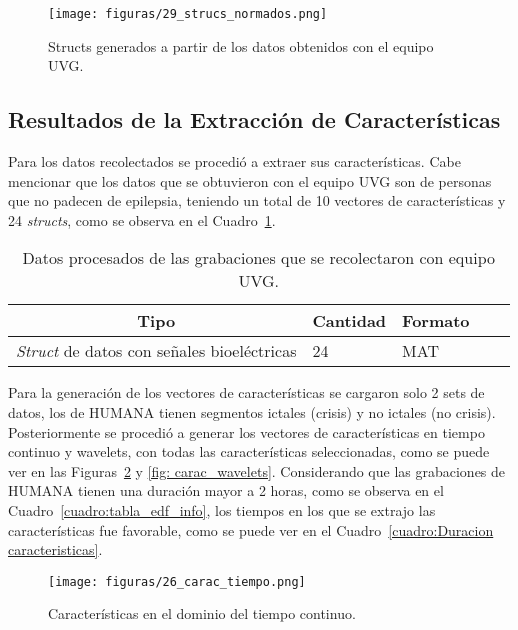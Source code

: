 \begin{figure}[t]
    \centering
    \texttt{[image: figuras/29\_strucs\_normados.png]}
    \caption{Structs generados a partir de los datos obtenidos con el equipo UVG.}
    \label{fig: Struct_normado}
\end{figure}

\subsection{Resultados de la Extracción de Características}
Para los datos recolectados se procedió a extraer sus características. Cabe mencionar que los datos que se obtuvieron con el equipo UVG son de personas que no padecen de epilepsia, teniendo un total de 10 vectores de características y 24 \textit{structs}, como se observa en el Cuadro~\ref{cuadro:tabla datos features UVG}.

\begin{table}[H]
\begin{center}
    \begin{tabular}{|l|l|l|l|l|}
    \hline
        \multicolumn{1}{|c|}{\textbf{Tipo}} & \multicolumn{1}{c|}{\textbf{Cantidad}} & \multicolumn{1}{c|}{\textbf{Formato}}\\ \hline
        \textit{Struct} de datos con señales bioeléctricas & 24  & MAT \\ \hline
    \end{tabular}
    \caption[Datos procesados en nube con equipo UVG]{Datos procesados de las grabaciones que se recolectaron con equipo UVG.} 
    \label{cuadro:tabla datos features UVG}
\end{center}
\end{table}

Para la generación de los vectores de características se cargaron solo 2 sets de datos, los de HUMANA tienen segmentos ictales (crisis) y no ictales (no crisis).
Posteriormente se procedió a generar los vectores de características en tiempo continuo y wavelets, con todas las características seleccionadas, como se puede ver en las Figuras~\ref{fig: carac_tiempo} y \ref{fig: carac_wavelets}. Considerando que las grabaciones de HUMANA tienen una duración mayor a 2 horas, como se observa en el Cuadro~\ref{cuadro:tabla_edf_info}, los tiempos en los que se extrajo las características fue favorable, como se puede ver en el Cuadro~\ref{cuadro:Duracion caracteristicas}. 

\begin{figure}[H]
    \centering
    \texttt{[image: figuras/26\_carac\_tiempo.png]}
    \caption{Características en el dominio del tiempo continuo.}
    \label{fig: carac_tiempo}
\end{figure}

